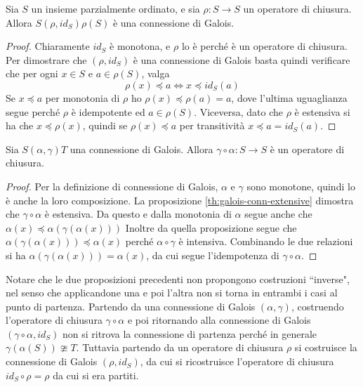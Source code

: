 \documentclass[12pt]{article}
\numberwithin{theorem}{subsection}
\begin{document}
\begin{prop}\label{th:closure-op-to-galois-conn}
	Sia $S$ un insieme parzialmente ordinato, e sia $\rho : S \rightarrow S$ un operatore di chiusura. Allora $S (\rho, id_S) \rho(S)$ è una connessione di Galois.
\end{prop}
\begin{proof}
	Chiaramente $id_S$ è monotona, e $\rho$ lo è perché è un operatore di chiusura. Per dimostrare che $(\rho, id_S)$ è una connessione di Galois basta quindi verificare che per ogni $x \in S$ e $a \in \rho(S)$, valga
	\[
	\rho(x) \preceq a \iff x \preceq id_S(a)
	\]
	Se $x \preceq a$ per monotonia di $\rho$ ho $\rho(x) \preceq \rho(a) = a$, dove l'ultima uguaglianza segue perché $\rho$ è idempotente ed $a \in \rho(S)$.
	Viceversa, dato che $\rho$ è estensiva si ha che $x \preceq \rho(x)$, quindi se $\rho(x) \preceq a$ per transitività $x \preceq a = id_S(a)$.
\end{proof}

\begin{prop}\label{th:galois-conn-to-closure-op}
	Sia $S (\alpha, \gamma) T$ una connessione di Galois. Allora $\gamma \circ \alpha : S \rightarrow S$ è un operatore di chiusura.
\end{prop}
\begin{proof}
	Per la definizione di connessione di Galois, $\alpha$ e $\gamma$ sono monotone, quindi lo è anche la loro composizione.
	La proposizione \ref{th:galois-conn-extensive} dimostra che $\gamma \circ \alpha$ è estensiva.
	Da questo e dalla monotonia di $\alpha$ segue anche che $\alpha(x) \preceq \alpha(\gamma(\alpha(x)))$
	Inoltre da quella proposizione segue che $\alpha(\gamma(\alpha(x))) \preceq \alpha(x)$ perché $\alpha \circ \gamma$ è intensiva. Combinando le due relazioni si ha $\alpha(\gamma(\alpha(x))) = \alpha(x)$, da cui segue l'idempotenza di $\gamma \circ \alpha$.
\end{proof}

\begin{remark}
	Notare che le due proposizioni precedenti non propongono costruzioni ``inverse", nel senso che applicandone una e poi l'altra non si torna in entrambi i casi al punto di partenza.
	Partendo da una connessione di Galois $(\alpha, \gamma)$, costruendo l'operatore di chiusura $\gamma \circ \alpha$ e poi ritornando alla connessione di Galois $(\gamma \circ \alpha, id_S)$ non si ritrova la connessione di partenza perché in generale $\gamma(\alpha(S)) \ncong T$.
	Tuttavia partendo da un operatore di chiusura $\rho$ si costruisce la connessione di Galois $(\rho, id_S)$, da cui si ricostruisce l'operatore di chiusura $id_S \circ \rho = \rho$ da cui si era partiti.
\end{remark}
\end{document}
